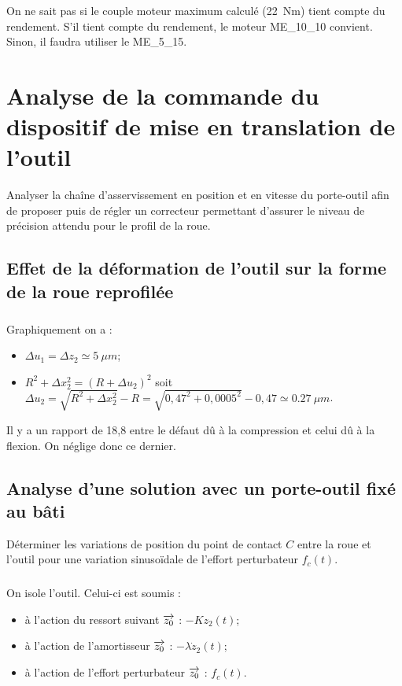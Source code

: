 \documentclass[10pt,fleqn]{article} %
\begin{document}
On ne sait pas si le couple moteur maximum calculé (\SI{22}{Nm}) tient compte du rendement. 
S'il tient compte du rendement, le moteur ME\_10\_10 convient. Sinon, il faudra utiliser le ME\_5\_15. 

\section{Analyse de la commande du dispositif de mise en translation de l’outil}
\begin{obj}
Analyser la chaîne d’asservissement en position et en vitesse du porte-outil afin de proposer puis de régler un correcteur permettant d’assurer le niveau de précision attendu pour le profil de la roue.
\end{obj}

\subsection{Effet de la déformation de l’outil sur la forme de la roue reprofilée}

\subparagraph{} %

Graphiquement on a :
\begin{itemize}
\item $\Delta u_1 = \Delta z_2 \simeq \SI{5}{\mu m}$;
\item $R^2 + \Delta x_2^2 = \left(R + \Delta u_2\right)^2$ soit $\Delta u_2 = \sqrt{R^2 + \Delta x_2^2} - R = \sqrt{0,47^2 + 0,0005^2} - 0,47 \simeq \SI{0,27}{\mu m}$.%
\end{itemize}
Il y a un rapport de 18,8 entre le défaut dû à la compression et celui dû à la flexion. On néglige donc ce dernier. 
 

\subsection{Analyse d’une solution avec un porte-outil fixé au bâti}
\begin{obj}
Déterminer les variations de position du point de contact $C$ entre la roue et l’outil pour une variation
sinusoïdale de l’effort perturbateur $f_c(t)$.
\end{obj}


\subparagraph{} %

On isole l'outil. Celui-ci est soumis :
\begin{itemize}
\item à l'action du ressort suivant $\overrightarrow{z_0}$ : $-Kz_2(t)$;
\item à l'action de l'amortisseur $\overrightarrow{z_0}$ : $-\lambda \dot{z}_2(t)$;
\item à l'action de l'effort perturbateur $\overrightarrow{z_0}$ : $f_c(t)$. 
\end{itemize}
\end{document}
